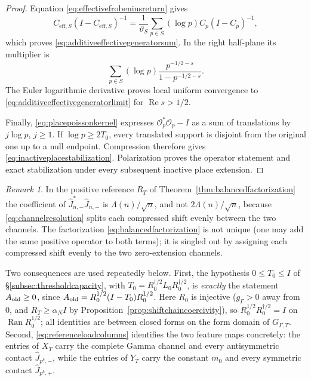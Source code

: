 \documentclass[11pt]{amsart}
\theoremstyle{definition}
\theoremstyle{remark}
\newtheorem{remark}[theorem]{Remark}
\begin{document}
\begin{proof}
Equation \eqref{eq:effectivefrobeniusreturn} gives
\[
 C_{\mathrm{eff},S}(I-C_{\mathrm{eff},S})^{-1}
 =\frac1{\vartheta_S}\sum_{p\in S}
      (\log p)C_p(I-C_p)^{-1},
\]
which proves \eqref{eq:additiveeffectivegeneratorsum}.  In the right
half-plane its multiplier is
\[
 \sum_{p\in S}(\log p)
    \frac{p^{-1/2-s}}{1-p^{-1/2-s}}.
\]
The Euler logarithmic derivative proves local uniform convergence to
\eqref{eq:additiveeffectivegeneratorlimit} for $\operatorname{Re}s>1/2$.

Finally, \eqref{eq:placepoissonkernel} expresses
$\mathcal O_p^*\mathcal O_p-I$ as a sum of translations by
$j\log p$, $j\ge1$.  If $\log p\ge2T_0$, every translated support is
disjoint from the original one up to a null endpoint.  Compression therefore
gives \eqref{eq:inactiveplacestabilization}.  Polarization proves the
operator statement and exact stabilization under every subsequent inactive
place extension.
\end{proof}

\begin{remark}\label{cor:referenceidentification}
In the positive reference \(R_T\) of Theorem~\ref{thm:balancedfactorization}
the coefficient of \(\widehat J_{n,-}^*\widehat J_{n,-}\) is
\(\Lambda(n)/\sqrt n\), and not \(2\Lambda(n)/\sqrt n\), because
\eqref{eq:channelresolution} splits each compressed shift evenly between the
two channels.  The factorization \eqref{eq:balancedfactorization} is not
unique (one may add the same positive operator to both terms); it is singled
out by assigning each compressed shift evenly to the two zero-extension
channels.
\end{remark}

Two consequences are used repeatedly below.  First, the hypothesis
\(0\le T_0\le I\) of \S\ref{subsec:thresholdcapacity}, with
\(T_0=R_0^{\dagger/2}L_0R_0^{\dagger/2}\), is \emph{exactly} the statement
\(A_{\rm old}\ge0\), since \(A_{\rm old}=R_0^{1/2}(I-T_0)R_0^{1/2}\).  Here
\(R_0\) is injective (\(g_\Gamma>0\) away from \(0\), and \(R_T\ge\alpha_NI\)
by Proposition~\ref{prop:shiftchaincoercivity}), so
\(R_0^{1/2}R_0^{\dagger/2}=I\) on \(\operatorname{Ran}R_0^{1/2}\); all
identities are between closed forms on the form domain of \(G_{\Gamma,T}\).
Second,
\eqref{eq:referenceloadcolumns} identifies the two feature maps concretely:
the entries of \(X_T\) carry the complete Gamma channel and every
antisymmetric contact \(\widehat J_{p^k,-}\), while the entries of \(Y_T\)
carry the constant \(m_0\) and every symmetric contact
\(\widehat J_{p^k,+}\).
\end{document}
